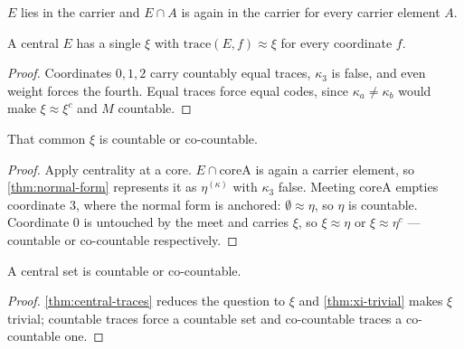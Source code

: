 \begin{definition}
\label{def:central}
\leanok
$E$ lies in the carrier and $E \cap A$ is again in the carrier for every carrier
element $A$.
\end{definition}

\begin{theorem}
\label{thm:central-traces}
\leanok
A central $E$ has a single $\xi$ with $\mathrm{trace}(E,f) \approx \xi$ for every
coordinate $f$.
\end{theorem}

\begin{proof}
\leanok
{}
Coordinates $0,1,2$ carry countably equal traces, $\kappa_3$ is false, and even
weight forces the fourth. Equal traces force equal codes, since
$\kappa_a \neq \kappa_b$ would make $\xi \approx \xi^{c}$ and $M$ countable.
\end{proof}

\begin{theorem}
\label{thm:xi-trivial}
\leanok
That common $\xi$ is countable or co-countable.
\end{theorem}

\begin{proof}
\leanok
{}
Apply centrality at a core. $E \cap \mathrm{coreA}$ is again a carrier element,
so \ref{thm:normal-form} represents it as $\eta^{(\kappa)}$ with $\kappa_3$
false. Meeting $\mathrm{coreA}$ empties coordinate $3$, where the normal form is
anchored: $\emptyset \approx \eta$, so $\eta$ is countable. Coordinate $0$ is
untouched by the meet and carries $\xi$, so $\xi \approx \eta$ or
$\xi \approx \eta^{c}$ --- countable or co-countable respectively.
\end{proof}

\begin{corollary}
\label{cor:centre}
\leanok
A central set is countable or co-countable.
\end{corollary}

\begin{proof}
\leanok
{}
\ref{thm:central-traces} reduces the question to $\xi$ and
\ref{thm:xi-trivial} makes $\xi$ trivial; countable traces force a countable set
and co-countable traces a co-countable one.
\end{proof}
